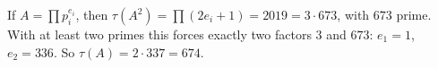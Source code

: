 If $A=\prod p_i^{e_i}$, then $\tau(A^2)=\prod(2e_i+1)=2019=3\cdot673$, with $673$ prime. With at least two primes this forces exactly two factors $3$ and $673$: $e_1=1$, $e_2=336$. So $\tau(A)=2\cdot337=\boxed{674}$.
